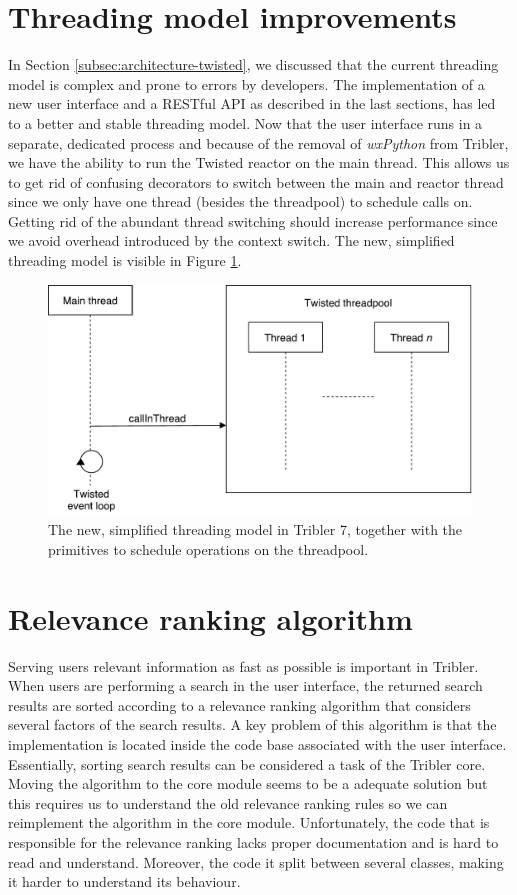 \section{Threading model improvements}
In Section \ref{subsec:architecture-twisted}, we discussed that the current threading model is complex and prone to errors by developers. The implementation of a new user interface and a RESTful API as described in the last sections, has led to a better and stable threading model. Now that the user interface runs in a separate, dedicated process and because of the removal of \emph{wxPython} from Tribler, we have the ability to run the Twisted reactor on the main thread. This allows us to get rid of confusing decorators to switch between the main and reactor thread since we only have one thread (besides the threadpool) to schedule calls on. Getting rid of the abundant thread switching should increase performance since we avoid overhead introduced by the context switch. The new, simplified threading model is visible in Figure \ref{fig:new-threading-model}.

\begin{figure}[h!]
	\centering
	\includegraphics[width=0.7\columnwidth]{images/improving_qa/new_threading_model_tribler}
	\caption{The new, simplified threading model in Tribler 7, together with the primitives to schedule operations on the threadpool.}
	\label{fig:new-threading-model}
\end{figure}

\section{Relevance ranking algorithm}
\label{sec:relevance-ranking-algorithm}
Serving users relevant information as fast as possible is important in Tribler. When users are performing a search in the user interface, the returned search results are sorted according to a relevance ranking algorithm that considers several factors of the search results. A key problem of this algorithm is that the implementation is located inside the code base associated with the user interface. Essentially, sorting search results can be considered a task of the Tribler core. Moving the algorithm to the core module seems to be a adequate solution but this requires us to understand the old relevance ranking rules so we can reimplement the algorithm in the core module. Unfortunately, the code that is responsible for the relevance ranking lacks proper documentation and is hard to read and understand. Moreover, the code it split between several classes, making it harder to understand its behaviour.

